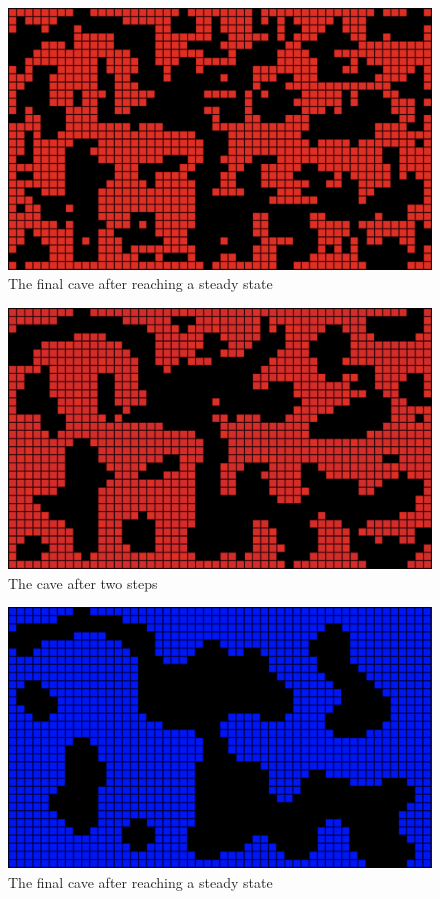 \documentclass[a4paper, 12pt]{article}
\begin{document}
\begin{figure}[h]
	\centering
	\includegraphics[width=\textwidth]{one-step-cave.png}
	\caption{The final cave after reaching a steady state}
	\label{fig:oneStepCave}
\end{figure}

\begin{figure}[h]
	\centering
	\includegraphics[width=\textwidth]{two-step-cave.png}
	\caption{The cave after two steps}
	\label{fig:twoStepCave}
\end{figure}

\begin{figure}[h]
	\centering
	\includegraphics[width=\textwidth]{final-cave.png}
	\caption{The final cave after reaching a steady state}
	\label{fig:finalCave}
\end{figure}

\clearpage

\printbibliography
\end{document}
